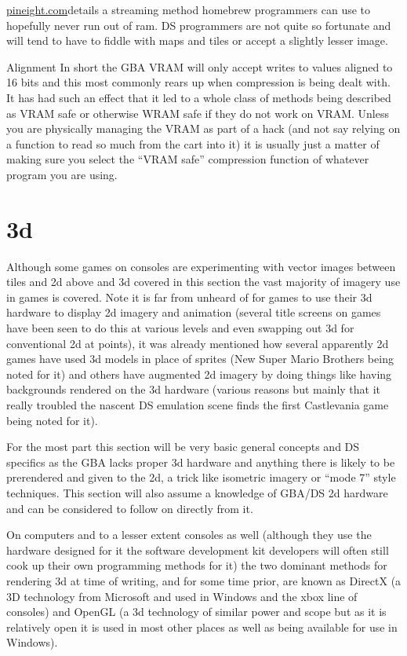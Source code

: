\documentclass[
]{book}
\begin{document}
\href{http://pineight.com/gba/managing-sprite-vram.txt}{pineight.com}details a streaming method homebrew programmers can use to hopefully never run out of ram. DS programmers are not quite so fortunate and will tend to have to fiddle with maps and tiles or accept a slightly lesser image.

Alignment In short the GBA VRAM will only accept writes to values aligned to 16 bits and this most commonly rears up when compression is being dealt with. It has had such an effect that it led to a whole class of methods being described as VRAM safe or otherwise WRAM safe if they do not work on VRAM. Unless you are physically managing the VRAM as part of a hack (and not say relying on a function to read so much from the cart into it) it is usually just a matter of making sure you select the ``VRAM safe'' compression function of whatever program you are using.

\hypertarget{d}{%
\section{3d}\label{d}}

Although some games on consoles are experimenting with vector images between tiles and 2d above and 3d covered in this section the vast majority of imagery use in games is covered. Note it is far from unheard of for games to use their 3d hardware to display 2d imagery and animation (several title screens on games have been seen to do this at various levels and even swapping out 3d for conventional 2d at points), it was already mentioned how several apparently 2d games have used 3d models in place of sprites (New Super Mario Brothers being noted for it) and others have augmented 2d imagery by doing things like having backgrounds rendered on the 3d hardware (various reasons but mainly that it really troubled the nascent DS emulation scene finds the first Castlevania game being noted for it).

For the most part this section will be very basic general concepts and DS specifics as the GBA lacks proper 3d hardware and anything there is likely to be prerendered and given to the 2d, a trick like isometric imagery or ``mode 7'' style techniques. This section will also assume a knowledge of GBA/DS 2d hardware and can be considered to follow on directly from it.

On computers and to a lesser extent consoles as well (although they use the hardware designed for it the software development kit developers will often still cook up their own programming methods for it) the two dominant methods for rendering 3d at time of writing, and for some time prior, are known as DirectX (a 3D technology from Microsoft and used in Windows and the xbox line of consoles) and OpenGL (a 3d technology of similar power and scope but as it is relatively open it is used in most other places as well as being available for use in Windows).
\end{document}
